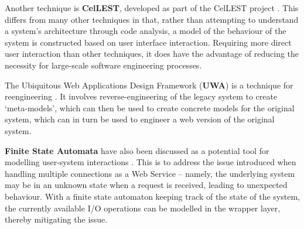 \documentclass[a1paper,portrait,fontscale=0.45]{baposter}
\begin{document}
\begin{poster}
{Another technique is \textbf{CelLEST}, developed as part of the CelLEST project \cite{Stroulia2000}. This differs from many other techniques in that, rather than attempting to understand a system's architecture through code analysis, a model of the behaviour of the system is constructed based on user interface interaction. Requiring more direct user interaction than other techniques, it does have the advantage of reducing the necessity for large-scale software engineering processes.
\vspace{1em}

The Ubiquitous Web Applications Design Framework (\textbf{UWA}) is a technique for reengineering \cite{Distante:2006:RLA:1134285.1134353}. It involves reverse-engineering of the legacy system to create `meta-models', which can then be used to create concrete models for the original system, which can in turn be used to engineer a web version of the original system.
\vspace{1em}

\textbf{Finite State Automata} have also been discussed as a potential tool for modelling user-system interactions \cite{Canfora2006}. This is to address the issue introduced when handling multiple connections as a Web Service -- namely, the underlying system may be in an unknown state when a request is received, leading to unexpected behaviour. With a finite state automaton keeping track of the state of the system, the currently available I/O operations can be modelled in the wrapper layer, thereby mitigating the issue.
}



\end{poster}
\end{document}
